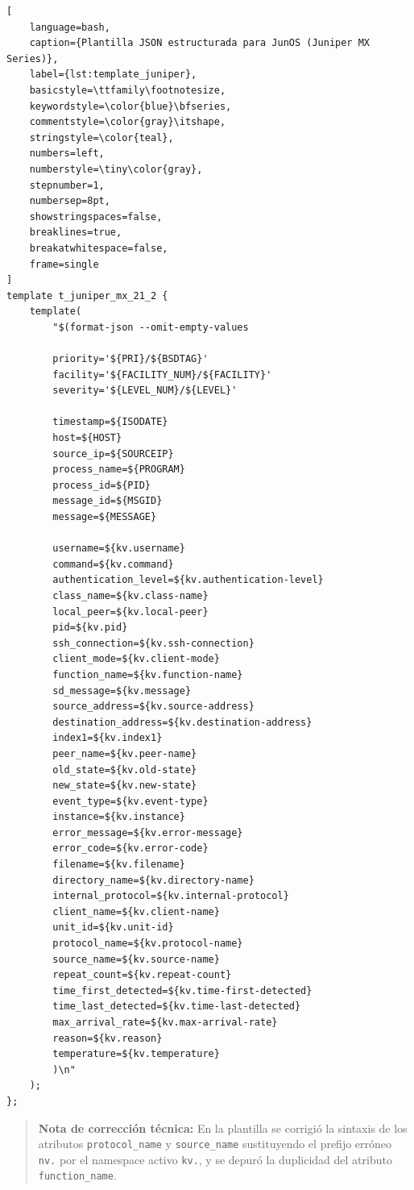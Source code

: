 \begin{lstlisting}[
    language=bash,
    caption={Plantilla JSON estructurada para JunOS (Juniper MX Series)},
    label={lst:template_juniper},
    basicstyle=\ttfamily\footnotesize,
    keywordstyle=\color{blue}\bfseries,
    commentstyle=\color{gray}\itshape,
    stringstyle=\color{teal},
    numbers=left,
    numberstyle=\tiny\color{gray},
    stepnumber=1,
    numbersep=8pt,
    showstringspaces=false,
    breaklines=true,
    breakatwhitespace=false,
    frame=single
]
template t_juniper_mx_21_2 {
    template(
        "$(format-json --omit-empty-values

        priority='${PRI}/${BSDTAG}'
        facility='${FACILITY_NUM}/${FACILITY}'
        severity='${LEVEL_NUM}/${LEVEL}'

        timestamp=${ISODATE}
        host=${HOST}
        source_ip=${SOURCEIP}
        process_name=${PROGRAM}
        process_id=${PID}
        message_id=${MSGID}
        message=${MESSAGE}

        username=${kv.username}
        command=${kv.command}
        authentication_level=${kv.authentication-level}
        class_name=${kv.class-name}
        local_peer=${kv.local-peer}
        pid=${kv.pid}
        ssh_connection=${kv.ssh-connection}
        client_mode=${kv.client-mode}
        function_name=${kv.function-name}
        sd_message=${kv.message}
        source_address=${kv.source-address}
        destination_address=${kv.destination-address}
        index1=${kv.index1}
        peer_name=${kv.peer-name}
        old_state=${kv.old-state}
        new_state=${kv.new-state}
        event_type=${kv.event-type}
        instance=${kv.instance}
        error_message=${kv.error-message}
        error_code=${kv.error-code}
        filename=${kv.filename}
        directory_name=${kv.directory-name}
        internal_protocol=${kv.internal-protocol}
        client_name=${kv.client-name}
        unit_id=${kv.unit-id}
        protocol_name=${kv.protocol-name}
        source_name=${kv.source-name}
        repeat_count=${kv.repeat-count}
        time_first_detected=${kv.time-first-detected}
        time_last_detected=${kv.time-last-detected}
        max_arrival_rate=${kv.max-arrival-rate}
        reason=${kv.reason}
        temperature=${kv.temperature}
        )\n"
    );
};
\end{lstlisting}

\begin{quote}
\textbf{Nota de corrección técnica:} En la plantilla se corrigió la sintaxis de los atributos \texttt{protocol\_name} y \texttt{source\_name} sustituyendo el prefijo erróneo \texttt{nv.} por el namespace activo \texttt{kv.}, y se depuró la duplicidad del atributo \texttt{function\_name}.
\end{quote}

